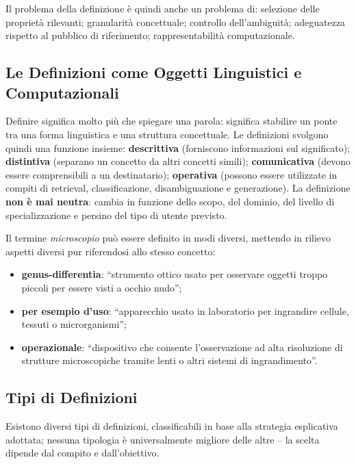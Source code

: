 \documentclass[12pt,a4paper]{article}
\begin{document}
Il problema della definizione \`e quindi anche un problema di: selezione delle propriet\`a rilevanti; granularit\`a concettuale; controllo dell'ambiguit\`a; adeguatezza rispetto al pubblico di riferimento; rappresentabilit\`a computazionale.

\subsection{Le Definizioni come Oggetti Linguistici e Computazionali}

Definire significa molto pi\`u che spiegare una parola: significa stabilire un ponte tra una forma linguistica e una struttura concettuale. Le definizioni svolgono quindi una funzione insieme: \textbf{descrittiva} (forniscono informazioni sul significato); \textbf{distintiva} (separano un concetto da altri concetti simili); \textbf{comunicativa} (devono essere comprensibili a un destinatario); \textbf{operativa} (possono essere utilizzate in compiti di retrieval, classificazione, disambiguazione e generazione). La definizione \textbf{non \`e mai neutra}: cambia in funzione dello scopo, del dominio, del livello di specializzazione e persino del tipo di utente previsto.

\begin{examplebox}
Il termine \textit{microscopio} pu\`o essere definito in modi diversi, mettendo in rilievo aspetti diversi pur riferendosi allo stesso concetto:
\begin{itemize}
  \item \textbf{genus-differentia}: ``strumento ottico usato per osservare oggetti troppo piccoli per essere visti a occhio nudo'';
  \item \textbf{per esempio d'uso}: ``apparecchio usato in laboratorio per ingrandire cellule, tessuti o microrganismi'';
  \item \textbf{operazionale}: ``dispositivo che consente l'osservazione ad alta risoluzione di strutture microscopiche tramite lenti o altri sistemi di ingrandimento''.
\end{itemize}
\end{examplebox}

\subsection{Tipi di Definizioni}

Esistono diversi tipi di definizioni, classificabili in base alla strategia esplicativa adottata; nessuna tipologia \`e universalmente migliore delle altre -- la scelta dipende dal compito e dall'obiettivo.
\end{document}
